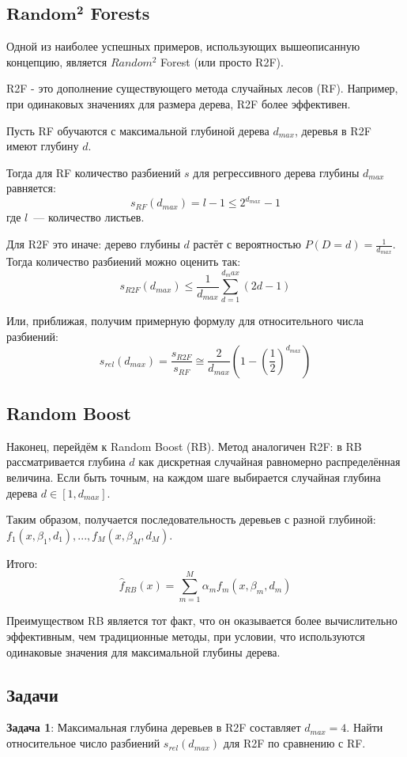 \subsection*{$\mathbf{Random^2}$ Forests}
Одной из наиболее успешных примеров, использующих вышеописанную концепцию, является $Random^2$ Forest (или просто R2F).

R2F - это дополнение существующего метода случайных лесов (RF). Например, при одинаковых значениях для размера дерева, R2F более эффективен.

Пусть RF обучаются с максимальной глубиной дерева $d_{max}$, деревья в R2F имеют глубину $d$.

Тогда для RF количество разбиений $s$ для регрессивного дерева глубины $d_{max}$ равняется:
$$s_{RF}(d_{max})=l - 1 \leq 2^{d_{max}} - 1$$
где $l$~--- количество листьев.

Для R2F это иначе: дерево глубины $d$ растёт с вероятностью $P(D=d) = \frac{1}{d_{max}}$. Тогда количество разбиений можно оценить так:
$$s_{R2F}(d_{max})\leq\frac{1}{d_{max}} \sum_{d=1}^{d_max}\left(2d-1\right)$$

Или, приближая, получим примерную формулу для относительного числа разбиений:
$$s_{rel}(d_{max}) = \frac{s_{R2F}}{s_{RF}} \cong \frac{2}{d_{max}} \left(1 - \left(\frac{1}{2}\right)^{d_{max}}\right)$$

\subsection*{Random Boost}
Наконец, перейдём к Random Boost (RB). Метод аналогичен R2F: в RB рассматривается глубина $d$ как дискретная случайная равномерно распределённая величина. Если быть точным, на каждом шаге выбирается случайная глубина дерева $d \in [1, d_{max}]$.

Таким образом, получается последовательность деревьев с разной глубиной: $f_1(x, \beta_1, d_1),...,f_M(x, \beta_M, d_M)$.

Итого:
$$\hat{f}_{RB}(x)=\sum_{m=1}^M \alpha_m f_m(x, \beta_m, d_m)$$

Преимуществом RB является тот факт, что он оказывается более вычислительно эффективным, чем традиционные методы, при условии, что используются одинаковые значения для максимальной глубины дерева.

\subsection*{Задачи}

\textbf{Задача 1}:
Максимальная глубина деревьев в R2F составляет $d_{max} = 4$. Найти относительное число разбиений $s_{rel}(d_{max})$ для R2F по сравнению с RF.


